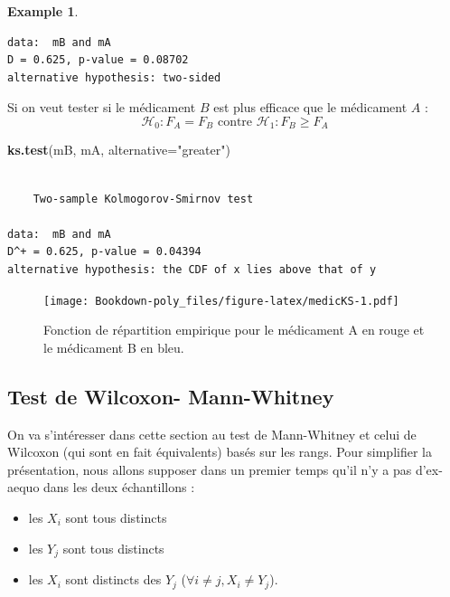 \documentclass[
]{book}
\newenvironment{Shaded}{\begin{snugshade}}{\end{snugshade}}
\newcommand{\DataTypeTok}[1]{\textcolor[rgb]{0.13,0.29,0.53}{#1}}
\newcommand{\KeywordTok}[1]{\textcolor[rgb]{0.13,0.29,0.53}{\textbf{#1}}}
\newcommand{\NormalTok}[1]{#1}
\newcommand{\StringTok}[1]{\textcolor[rgb]{0.31,0.60,0.02}{#1}}
\providecommand{\tightlist}{%
  \setlength{\itemsep}{0pt}\setlength{\parskip}{0pt}}
\theoremstyle{definition}
\theoremstyle{definition}
\newtheorem{example}{Example}[chapter]
\theoremstyle{definition}
\theoremstyle{definition}
\theoremstyle{remark}
\begin{document}
\begin{example}
\begin{verbatim}
data:  mB and mA
D = 0.625, p-value = 0.08702
alternative hypothesis: two-sided
\end{verbatim}

Si on veut tester si le médicament \(B\) est plus efficace que le médicament \(A\) :
\[\mathcal{H}_0: F_A = F_B \textrm{ contre }\mathcal{H}_1: F_B\geq F_A\]

\begin{Shaded}
\begin{Highlighting}[]
\KeywordTok{ks.test}\NormalTok{(mB, mA, }\DataTypeTok{alternative=}\StringTok{"greater"}\NormalTok{)}
\end{Highlighting}
\end{Shaded}

\begin{verbatim}

    Two-sample Kolmogorov-Smirnov test

data:  mB and mA
D^+ = 0.625, p-value = 0.04394
alternative hypothesis: the CDF of x lies above that of y
\end{verbatim}

\begin{figure}
\centering
\texttt{[image: Bookdown-poly\_files/figure-latex/medicKS-1.pdf]}
\caption{\label{fig:medicKS}\label{medicKS} Fonction de répartition empirique pour le médicament A en rouge et le médicament B en bleu.}
\end{figure}

\end{example}

\hypertarget{test-de-wilcoxon--mann-whitney}{%
\subsection{Test de Wilcoxon- Mann-Whitney}\label{test-de-wilcoxon--mann-whitney}}

On va s'intéresser dans cette section au test de Mann-Whitney et celui de Wilcoxon (qui sont en fait équivalents) basés sur les rangs.
Pour simplifier la présentation, nous allons supposer dans un premier temps qu'il n'y a pas d'ex-aequo dans les deux échantillons :

\begin{itemize}
\tightlist
\item
  les \(X_i\) sont tous distincts
\item
  les \(Y_j\) sont tous distincts
\item
  les \(X_i\) sont distincts des \(Y_j\) (\(\forall i\neq j, X_i\neq Y_j\)).
\end{itemize}
\end{document}
